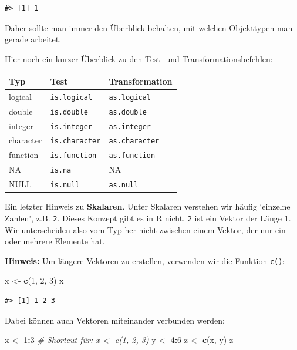 \documentclass[]{book}
\newenvironment{Shaded}{\begin{snugshade}}{\end{snugshade}}
\newcommand{\KeywordTok}[1]{\textcolor[rgb]{0.13,0.29,0.53}{\textbf{#1}}}
\newcommand{\DecValTok}[1]{\textcolor[rgb]{0.00,0.00,0.81}{#1}}
\newcommand{\StringTok}[1]{\textcolor[rgb]{0.31,0.60,0.02}{#1}}
\newcommand{\CommentTok}[1]{\textcolor[rgb]{0.56,0.35,0.01}{\textit{#1}}}
\newcommand{\OperatorTok}[1]{\textcolor[rgb]{0.81,0.36,0.00}{\textbf{#1}}}
\newcommand{\NormalTok}[1]{#1}
\begin{document}
\begin{verbatim}
#> [1] 1
\end{verbatim}

Daher sollte man immer den Überblick behalten, mit welchen Objekttypen
man gerade arbeitet.

Hier noch ein kurzer Überblick zu den Test- und Transformationsbefehlen:

\begin{longtable}[]{@{}lll@{}}
\toprule
Typ & Test & Transformation\tabularnewline
\midrule
\endhead
logical & \texttt{is.logical} & \texttt{as.logical}\tabularnewline
double & \texttt{is.double} & \texttt{as.double}\tabularnewline
integer & \texttt{is.integer} & \texttt{as.integer}\tabularnewline
character & \texttt{is.character} & \texttt{as.character}\tabularnewline
function & \texttt{is.function} & \texttt{as.function}\tabularnewline
NA & \texttt{is.na} & NA\tabularnewline
NULL & \texttt{is.null} & \texttt{as.null}\tabularnewline
\bottomrule
\end{longtable}

Ein letzter Hinweis zu \textbf{Skalaren}. Unter Skalaren verstehen wir
häufig `einzelne Zahlen', z.B. \texttt{2}. Dieses Konzept gibt es in R
nicht. \texttt{2} ist ein Vektor der Länge 1. Wir unterscheiden also vom
Typ her nicht zwischen einem Vektor, der nur ein oder mehrere Elemente
hat.

\textbf{Hinweis:} Um längere Vektoren zu erstellen, verwenden wir die
Funktion \texttt{c()}:

\begin{Shaded}
\begin{Highlighting}[]
\NormalTok{x <-}\StringTok{ }\KeywordTok{c}\NormalTok{(}\DecValTok{1}\NormalTok{, }\DecValTok{2}\NormalTok{, }\DecValTok{3}\NormalTok{)}
\NormalTok{x}
\end{Highlighting}
\end{Shaded}

\begin{verbatim}
#> [1] 1 2 3
\end{verbatim}

Dabei können auch Vektoren miteinander verbunden werden:

\begin{Shaded}
\begin{Highlighting}[]
\NormalTok{x <-}\StringTok{ }\DecValTok{1}\OperatorTok{:}\DecValTok{3} \CommentTok{# Shortcut für: x <- c(1, 2, 3)}
\NormalTok{y <-}\StringTok{ }\DecValTok{4}\OperatorTok{:}\DecValTok{6}
\NormalTok{z <-}\StringTok{ }\KeywordTok{c}\NormalTok{(x, y)}
\NormalTok{z}
\end{Highlighting}
\end{Shaded}
\end{document}
